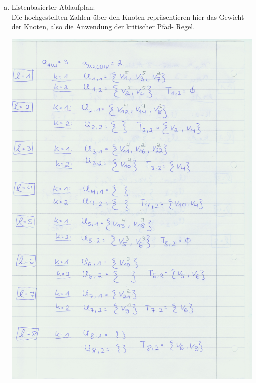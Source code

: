 \documentclass[a4paper]{scrartcl}
\begin{document}
\begin{enumerate}[(a)]
	\item
	
	Listenbasierter Ablaufplan: \\
	Die hochgestellten Zahlen über den Knoten repräsentieren hier das Gewicht der Knoten, also die Anwendung der \glqq kritischer Pfad\grqq - Regel.
	
	\includegraphics[scale=0.8]{Image129}

\end{enumerate}
\end{document}
